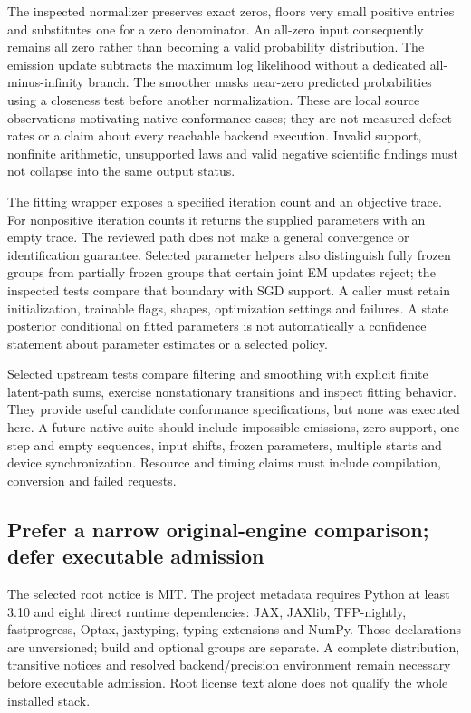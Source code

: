 The inspected normalizer preserves exact zeros, floors very small positive
entries and substitutes one for a zero denominator. An all-zero input consequently
remains all zero rather than becoming a valid probability distribution. The
emission update subtracts the maximum log likelihood without a dedicated
all-minus-infinity branch. The smoother masks near-zero predicted probabilities
using a closeness test before another normalization. These are local source
observations motivating native conformance cases; they are not measured defect
rates or a claim about every reachable backend execution. Invalid support,
nonfinite arithmetic, unsupported laws and valid negative scientific findings
must not collapse into the same output status.~\citep{exec19_dynamax_source}

The fitting wrapper exposes a specified iteration count and an objective trace.
For nonpositive iteration counts it returns the supplied parameters with an
empty trace. The reviewed path does not make a general convergence or
identification guarantee. Selected parameter helpers also distinguish fully
frozen groups from partially frozen groups that certain joint EM updates
reject; the inspected tests compare that boundary with SGD support. A caller
must retain initialization, trainable flags, shapes, optimization settings and
failures. A state posterior conditional on fitted parameters is not automatically
a confidence statement about parameter estimates or a selected policy.
\citep{exec19_dynamax_source}

Selected upstream tests compare filtering and smoothing with explicit finite
latent-path sums, exercise nonstationary transitions and inspect fitting
behavior. They provide useful candidate conformance specifications, but none
was executed here. A future native suite should include impossible emissions,
zero support, one-step and empty sequences, input shifts, frozen parameters,
multiple starts and device synchronization. Resource and timing claims must
include compilation, conversion and failed requests.~\citep{exec19_dynamax_source}

\subsection{Prefer a narrow original-engine comparison; defer executable admission}
\label{exec19:dynamax-choice}

The selected root notice is MIT. The project metadata requires Python at least
3.10 and eight direct runtime dependencies: JAX, JAXlib, TFP-nightly,
fastprogress, Optax, jaxtyping, typing-extensions and NumPy. Those declarations
are unversioned; build and optional groups are separate. A complete distribution,
transitive notices and resolved backend/precision environment remain necessary
before executable admission. Root license text alone does not qualify the whole
installed stack.~\citep{exec19_dynamax_source}

